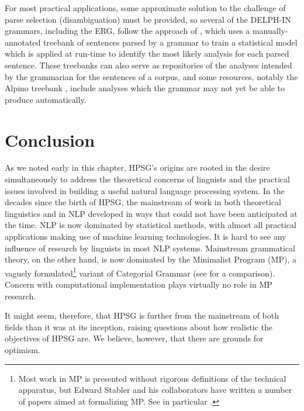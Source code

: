 \documentclass[output=paper]{langsci/langscibook}
\begin{document}
For most practical applications, some approximate solution to the challenge of parse selection (disambiguation) must be provided, so several of the DELPH-IN grammars, including the ERG, follow the approach of \citet{OFTM2004a-u-platte}, which uses a manually-annotated treebank of sentences parsed by a grammar to train a statistical model which is applied at run-time to identify the most likely analysis for each parsed sentence.  These treebanks can also serve as repositories of the analyses intended by the grammarian for the sentences of a corpus, and some resources, notably the Alpino treebank \citep{BvNM2001a-u}, include analyses which the grammar may not yet be able to produce automatically.  

\section{Conclusion}

As we noted early in this chapter, HPSG's origins are rooted in the desire simultaneously to address the theoretical concerns of linguists and the practical issues involved in building a useful natural language processing system.  In the decades since the birth of HPSG, the mainstream of work in both theoretical linguistics and in NLP developed in ways that could not have been anticipated at the time.  NLP is now dominated by statistical methods, with almost all practical applications making use of machine learning technologies.  It is hard to see any influence of research by linguists in most NLP systems.  Mainstream grammatical theory, on the other hand, is now dominated by the Minimalist Program (MP), a vaguely formulated\footnote{Most work in MP is presented without rigorous definitions of the technical apparatus, but Edward Stabler and his collaborators have written a number of papers aimed at formalizing MP.  See in particular \citet{CollStab2016}.} variant of Categorial Grammar (see \citet{RetStab2004} for a comparison).  Concern with computational implementation plays virtually no role in MP research.  

It might seem, therefore, that HPSG is further from the mainstream of both fields than it was at its inception, raising questions about how realistic the objectives of HPSG are.  We believe, however, that there are grounds for optimism.
\end{document}
